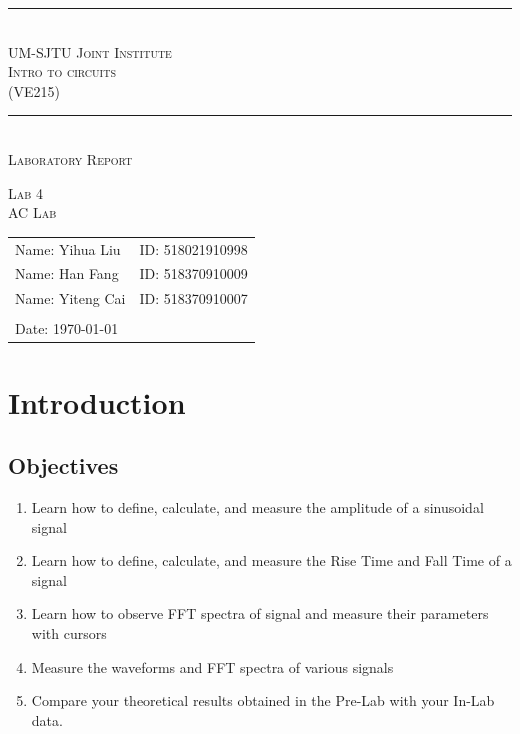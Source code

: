 \documentclass[a4paper]{report}
\begin{document}
	\renewcommand\thesection{\arabic{section}}
	\begin{Large}
		\begin{center}
			\setlength{\baselineskip}{14pt}
			\vspace{1.25cm}
			\rule[0cm]{11.2cm}{0.03em}\\
			\vspace{0.5cm}
			\textsc{UM-SJTU Joint Institute}\\
			\vspace{0.25cm}
			\textsc{Intro to circuits\\(VE215)}
			\vspace{0.3cm}
			\rule[0cm]{11.8cm}{0.05em}
			\vspace{4.9cm}\\
			\textsc{Laboratory Report}
		\end{center}
	\end{Large}
	\vspace{0.85cm}
	\begin{large}
		\begin{center}
			\textsc{Lab 4}
			\vspace{1em}\\
			\textsc{AC Lab}
		\end{center}
		\vspace{6cm}
	\end{large}
	\begin{tabular}{l l}
	Name: Yihua Liu&ID: 518021910998\\
	Name: Han Fang&ID: 518370910009\\
	Name: Yiteng Cai&ID: 518370910007\\
	&\\
	Date: \today&\\
	\end{tabular}
	\thispagestyle{empty}
	\newpage
\section{Introduction}
\subsection{Objectives}
\begin{enumerate}
	\item Learn how to define, calculate, and measure the amplitude of a sinusoidal signal
	\item Learn how to define, calculate, and measure the Rise Time and Fall Time of a signal
	\item Learn how to observe FFT spectra of signal and measure their parameters with cursors
	\item Measure the waveforms and FFT spectra of various signals
	\item Compare your theoretical results obtained in the Pre-Lab with your In-Lab data.
\end{enumerate}
\end{document}
